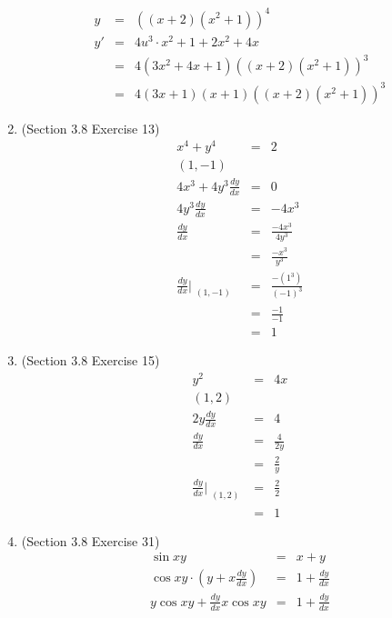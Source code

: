 \documentclass{article}
\begin{document}
\begin{enumerate}
\begin{eqnarray}
            y &=& \left(\left(x+2\right)\left(x^2+1\right)\right)^4 \\
            y' &=& 4u^3 \cdot x^2 + 1 + 2x^2 + 4x \\
               &=& 4\left(3x^2 + 4x + 1\right)\left(\left(x+2\right)\left(x^2+1\right)\right)^3 \\
               &=& 4\left(3x + 1\right)\left(x + 1\right)\left(\left(x+2\right)\left(x^2+1\right)\right)^3
        \end{eqnarray}
    \item (Section 3.8 Exercise 13)
        \begin{eqnarray}
            x^4 + y^4 &=& 2 \\
            (1, -1) \\
            4x^3 + 4y^3\frac{dy}{dx} &=& 0 \\
            4y^3\frac{dy}{dx} &=& -4x^3 \\
            \frac{dy}{dx} &=& \frac{-4x^3}{4y^3} \\
                          &=& \frac{-x^3}{y^3} \\
            \frac{dy}{dx}\Bigr|_{\substack{(1,-1)}} &=& \frac{-(1^3)}{(-1)^3} \\
                                                    &=& \frac{-1}{-1} \\
                                                    &=& 1
        \end{eqnarray}
    \item (Section 3.8 Exercise 15)
        \begin{eqnarray}
            y^2 &=& 4x \\
            (1, 2) \\
            2y\frac{dy}{dx} &=& 4 \\
            \frac{dy}{dx} &=& \frac{4}{2y} \\
                          &=& \frac{2}{y} \\
            \frac{dy}{dx}\Bigr|_{\substack{(1,2)}} &=& \frac{2}{2} \\
                                                   &=& 1
        \end{eqnarray}
    \item (Section 3.8 Exercise 31)
        \begin{eqnarray}
            \sin{xy} &=& x + y \\
            \cos{xy} \cdot \left(y + x \frac{dy}{dx}\right) &=& 1 + \frac{dy}{dx} \\
            y\cos{xy} + \frac{dy}{dx}x\cos{xy} &=& 1 + \frac{dy}{dx} \\

\end{eqnarray}
\end{enumerate}
\end{document}
